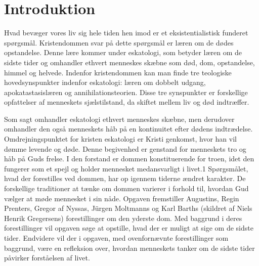 \chapter{Introduktion}
Hvad bevæger vores liv sig hele tiden hen imod er et eksistentialistisk funderet spørgsmål. Kristendommen svar på dette spørgsmål er læren om de dødes opstandelse. Denne lære kommer under eskatologi, som betyder læren om de sidste tider og omhandler ethvert menneskes skæbne som død, dom, opstandelse, himmel og helvede. Indenfor kristendommen kan man finde tre teologiske hovedsynspunkter indenfor eskatologi: læren om dobbelt udgang, apokatastasislæren og annihilationsteorien. Disse tre synspunkter er forskellige opfattelser af menneskets sjælstilstand, da skiftet mellem liv og død indtræffer.

Som sagt omhandler eskatologi ethvert menneskes skæbne, men derudover omhandler den også menneskets håb på en kontinuitet efter dødens indtrædelse. Omdrejningspunktet for kristen eskatologi er Kristi genkomst, hvor han vil dømme levende og døde. Denne begivenhed er genstand for menneskets tro og håb på Guds frelse. I den forstand er dommen konstituerende for troen, idet den fungerer som et spejl og holder mennesket medansvarligt i livet.1 Spørgsmålet, hvad der forestilles ved dommen, har op igennem tiderne ændret karakter. De forskellige traditioner at tænke om dommen varierer i forhold til, hvordan Gud vælger at møde mennesket i sin nåde. Opgaven fremstiller Augustins, Regin Prenters, Gregor af Nyssas, Jürgen Moltmanns og Karl Barths (skildret af Niels Henrik Gregersens) forestillinger om den yderste dom. Med baggrund i deres forestillinger vil opgaven søge at opstille, hvad der er muligt at sige om de sidste tider. Endvidere vil der i opgaven, med ovenfornævnte forestillinger som baggrund, være en refleksion over, hvordan menneskets tanker om de sidste tider påvirker forståelsen af livet.